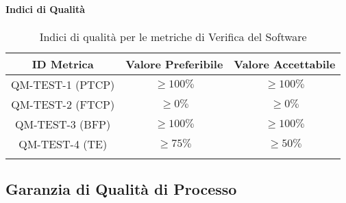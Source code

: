 		\paragraph{Indici di Qualità}

			\begin{center}
				\begin{longtable}{|c|c|c|}
				\hline
				\rowcolor{lighter-grayer}
				\textbf{ID Metrica} & \textbf{Valore Preferibile} & \textbf{Valore Accettabile}\\
				\hline
				\endfirsthead
				\hline
				QM-TEST-1 (PTCP) & \(\geq 100\%\) & \(\geq 100\%\) \\ \hline
				QM-TEST-2 (FTCP) & \(\geq 0\%\) & \(\geq 0\%\) \\ \hline
				QM-TEST-3 (BFP) & \(\geq 100\%\) & \(\geq 100\%\) \\ \hline
				QM-TEST-4 (TE) & \(\geq 75\%\) & \(\geq 50\%\) \\ \hline
				\hline
				\caption{Indici di qualità per le metriche di Verifica del Software}
				\end{longtable}
			\end{center}









\subsection{Garanzia di Qualità di Processo}

